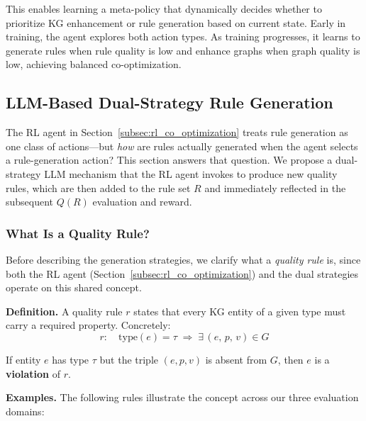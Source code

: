 \documentclass[runningheads]{llncs}
\begin{document}
This enables learning a meta-policy that dynamically decides whether to prioritize KG enhancement or rule generation based on current state. Early in training, the agent explores both action types. As training progresses, it learns to generate rules when rule quality is low and enhance graphs when graph quality is low, achieving balanced co-optimization.

\subsection{LLM-Based Dual-Strategy Rule Generation}
\label{subsec:llm_rule}

The RL agent in Section~\ref{subsec:rl_co_optimization} treats rule generation as one class of actions—but \emph{how} are rules actually generated when the agent selects a rule-generation action? This section answers that question. We propose a dual-strategy LLM mechanism that the RL agent invokes to produce new quality rules, which are then added to the rule set $R$ and immediately reflected in the subsequent $Q(R)$ evaluation and reward.

\subsubsection{What Is a Quality Rule?}
\label{subsubsec:rule_def}

Before describing the generation strategies, we clarify what a \textit{quality rule} is,
since both the RL agent (Section~\ref{subsec:rl_co_optimization}) and the dual strategies operate on this shared concept.

\textbf{Definition.} A quality rule $r$ states that every KG entity of a given type must carry a
required property. Concretely:
\begin{equation}
    r: \quad \mathrm{type}(e) = \tau \;\Longrightarrow\; \exists\,(e,\, p,\, v) \in G
    \label{eq:rule_def}
\end{equation}

If entity $e$ has type $\tau$ but the triple $(e, p, v)$ is absent from $G$, then $e$ is a \textbf{violation} of $r$.

\textbf{Examples.} The following rules illustrate the concept across our three evaluation domains:
\end{document}

